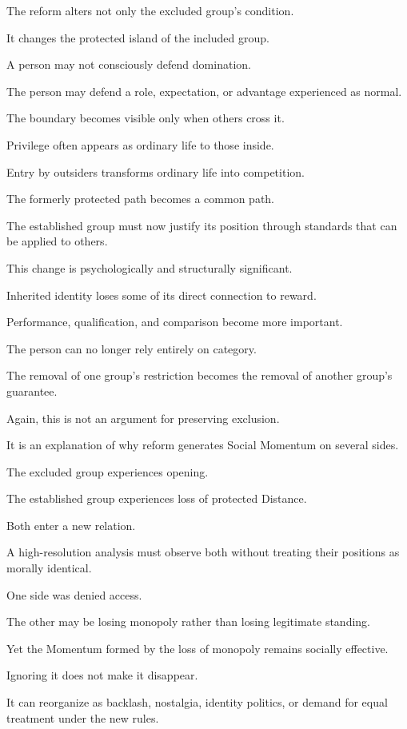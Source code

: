 The reform alters not only the excluded group’s condition.

It changes the protected island of the included group.

A person may not consciously defend domination.

The person may defend a role, expectation, or advantage experienced as normal.

The boundary becomes visible only when others cross it.

Privilege often appears as ordinary life to those inside.

Entry by outsiders transforms ordinary life into competition.

The formerly protected path becomes a common path.

The established group must now justify its position through standards that can be applied to others.

This change is psychologically and structurally significant.

Inherited identity loses some of its direct connection to reward.

Performance, qualification, and comparison become more important.

The person can no longer rely entirely on category.

The removal of one group’s restriction becomes the removal of another group’s guarantee.

Again, this is not an argument for preserving exclusion.

It is an explanation of why reform generates Social Momentum on several sides.

The excluded group experiences opening.

The established group experiences loss of protected Distance.

Both enter a new relation.

A high-resolution analysis must observe both without treating their positions as morally identical.

One side was denied access.

The other may be losing monopoly rather than losing legitimate standing.

Yet the Momentum formed by the loss of monopoly remains socially effective.

Ignoring it does not make it disappear.

It can reorganize as backlash, nostalgia, identity politics, or demand for equal treatment under the new rules.

